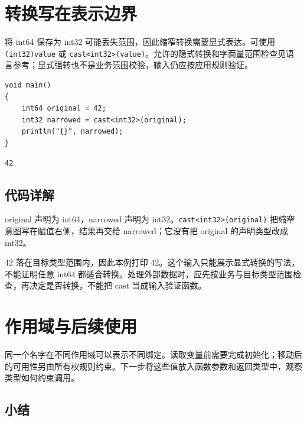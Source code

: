 \section{转换写在表示边界}

将 int64 保存为 int32 可能丢失范围，因此缩窄转换需要显式表达。可使用 \texttt{(\allowbreak{}int32)\allowbreak{}value} 或 \texttt{cast<\allowbreak{}int32>\allowbreak{}(\allowbreak{}value)\allowbreak{}}。允许的隐式转换和字面量范围检查见语言参考；显式强转也不是业务范围校验，输入仍应按应用规则验证。

\par
\medskip
\begin{lstlisting}[style=chali]
void main()
{
    int64 original = 42;
    int32 narrowed = cast<int32>(original);
    println("{}", narrowed);
}
\end{lstlisting}
\par
\medskip

\par
\medskip
\begin{lstlisting}[style=out]
42
\end{lstlisting}
\par
\medskip

\subsection*{代码详解}

original 声明为 int64，narrowed 声明为 int32。\texttt{cast<\allowbreak{}int32>\allowbreak{}(\allowbreak{}original)\allowbreak{}} 把缩窄意图写在赋值右侧，结果再交给 narrowed；它没有把 original 的声明类型改成 int32。

42 落在目标类型范围内，因此本例打印 42。这个输入只能展示显式转换的写法，不能证明任意 int64 都适合转换。处理外部数据时，应先按业务与目标类型范围检查，再决定是否转换，不能把 cast 当成输入验证函数。

\section{作用域与后续使用}

同一个名字在不同作用域可以表示不同绑定。读取变量前需要完成初始化；移动后的可用性另由所有权规则约束。下一步将这些值放入函数参数和返回类型中，观察类型如何约束调用。

\subsection*{小结}

